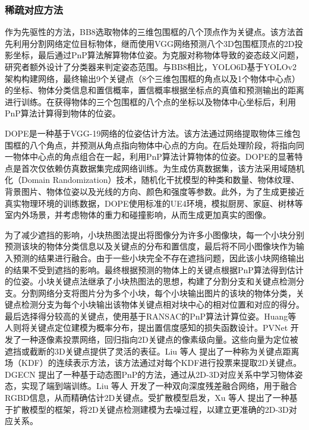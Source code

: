 \subsubsection{稀疏对应方法}\label{稀疏对应方法}
作为先驱性的方法，BB8\cite{rad2017bb8}选取物体的三维包围框的八个顶点作为关键点。该方法首先利用分割网络定位目标物体，继而使用VGG网络\cite{VGG}预测八个3D包围框顶点的2D投影坐标，最后通过PnP算法\cite{EPnP}解算物体位姿。为克服对称物体导致的姿态歧义问题，研究者额外设计了分类器来判定姿态范围。与BB8相比，YOLO6D\cite{tekin2018real}基于YOLOv2架构\cite{YOLO}构建网络，最终输出9个关键点（8个三维包围框的角点以及1个物体中心点）的坐标、物体分类信息和置信概率，置信概率根据坐标点的真值和预测输出的距离进行训练。在获得物体的三个包围框的八个点的坐标以及物体中心坐标后，利用PnP算法\cite{RANSAC}计算得到物体的位姿。

\par DOPE\cite{dope}是一种基于VGG-19\cite{VGG}网络的位姿估计方法。该方法通过网络提取物体三维包围框的八个角点，并预测从角点指向物体中心点的方向。在后处理阶段，将指向同一物体中心点的角点组合在一起，利用PnP算法计算物体的位姿。DOPE的显著特点是首次仅依赖仿真数据集完成网络训练。为生成仿真数据集，该方法采用域随机化（Domain Randomization）技术，随机化干扰模型的种类和数量、物体纹理、背景图片、物体位姿以及光线的方向、颜色和强度等参数。此外，为了生成更接近真实物理环境的训练数据，DOPE使用标准的UE4环境，模拟厨房、家庭、树林等室内外场景，并考虑物体的重力和碰撞影响，从而生成更加真实的图像。

为了减少遮挡的影响，小块热图法\cite{oberweger2018making}提出将图像分为许多小图像块，每一个小块分别预测该块的物体分类信息以及关键点的分布和置信度，最后将不同小图像块作为输入预测的结果进行融合。由于一些小块完全不存在遮挡问题，因此该小块网络输出的结果不受到遮挡的影响。最终根据预测的物体上的关键点根据PnP算法得到估计的位姿。小块关键点法\cite{Hu2019Segmentation}继承了小块热图法的思想，构建了分割分支和关键点检测分支。分割网络分支将图片分为多个小块，每个小块输出图片的该块的物体分类，关键点检测分支为每个小块输出该物体关键点相对块中心的相对位置和对应的得分。最后选择得分较高的关键点，使用基于RANSAC的PnP算法计算位姿。Huang等人\cite{Huang2021Confidence}则将关键点定位建模为概率分布，提出置信度感知的损失函数设计。PVNet\cite{peng2019pvnet} 开发了一种逐像素投票网络，回归指向2D关键点的像素级向量。这些向量为定位被遮挡或截断的3D关键点提供了灵活的表征。Liu 等人\cite{liu2021kdfnet} 提出了一种称为关键点距离场（KDF）的连续表示方法，该方法通过对每个KDF进行投票来提取2D关键点。DGECN\cite{cao2022dgecn} 提出了一种基于动态图PnP\cite{RANSAC}的方法，通过从2D-3D对应关系中学习物体姿态，实现了端到端训练。Liu 等人\cite{liu2023bdr6d} 开发了一种双向深度残差融合网络，用于融合RGBD信息，从而精确估计2D关键点。受扩散模型启发，Xu 等人\cite{xu20246ddiff} 提出了一种基于扩散模型的框架，将2D关键点检测建模为去噪过程，以建立更准确的2D-3D对应关系。

